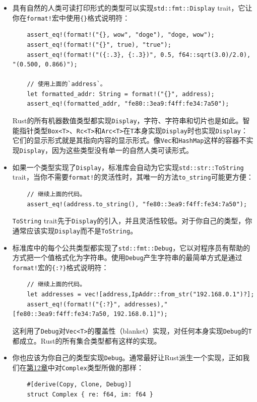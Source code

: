 \begin{itemize}
    \item 具有自然的人类可读打印形式的类型可以实现\texttt{std::fmt::Display} trait，它让你在\texttt{format!}宏中使用\texttt{\{\}}格式说明符：
\begin{verbatim}
    assert_eq!(format!("{}, wow", "doge"), "doge, wow");
    assert_eq!(format!("{}", true), "true");
    assert_eq!(format!("({:.3}, {:.3})", 0.5, f64::sqrt(3.0)/2.0), "(0.500, 0.866)");

    // 使用上面的`address`。
    let formatted_addr: String = format!("{}", address);
    assert_eq!(formatted_addr, "fe80::3ea9:f4ff:fe34:7a50");
\end{verbatim}

    Rust的所有机器数值类型都实现\texttt{Display}，字符、字符串和切片也是如此。智能指针类型\texttt{Box<T>}、\texttt{Rc<T>}和\texttt{Arc<T>}在\texttt{T}本身实现\texttt{Display}时也实现\texttt{Display}：它们的显示形式就是其指向内容的显示形式。像\texttt{Vec}和\texttt{HashMap}这样的容器不实现\texttt{Display}，因为这些类型没有单一的自然人类可读形式。

    \item 如果一个类型实现了\texttt{Display}，标准库会自动为它实现\texttt{std::str::ToString} trait，当你不需要\texttt{format!}的灵活性时，其唯一的方法\texttt{to\_string}可能更方便：
\begin{verbatim}
    // 继续上面的代码。
    assert_eq!(address.to_string(), "fe80::3ea9:f4ff:fe34:7a50");
\end{verbatim}

    \texttt{ToString} trait先于\texttt{Display}的引入，并且灵活性较低。对于你自己的类型，你通常应该实现\texttt{Display}而不是\texttt{ToString}。

    \item 标准库中的每个公共类型都实现了\texttt{std::fmt::Debug}，它以对程序员有帮助的方式把一个值格式化为字符串。使用\texttt{Debug}产生字符串的最简单方式是通过\texttt{format!}宏的\texttt{\{:?\}}格式说明符：
\begin{verbatim}
    // 继续上面的代码。
    let addresses = vec![address,IpAddr::from_str("192.168.0.1")?];
    assert_eq!(format!("{:?}", addresses),"[fe80::3ea9:f4ff:fe34:7a50, 192.168.0.1]");
\end{verbatim}

    这利用了\texttt{Debug}对\texttt{Vec<T>}的覆盖性（blanket）实现，对任何本身实现\texttt{Debug}的\texttt{T}都成立。Rust的所有集合类型都有这样的实现。

    \item 你也应该为你自己的类型实现\texttt{Debug}。通常最好让Rust派生一个实现，正如我们在\hyperref[ch12]{第12章}中对\texttt{Complex}类型所做的那样：
\begin{verbatim}
    #[derive(Copy, Clone, Debug)]
    struct Complex { re: f64, im: f64 }
\end{verbatim}
\end{itemize}

